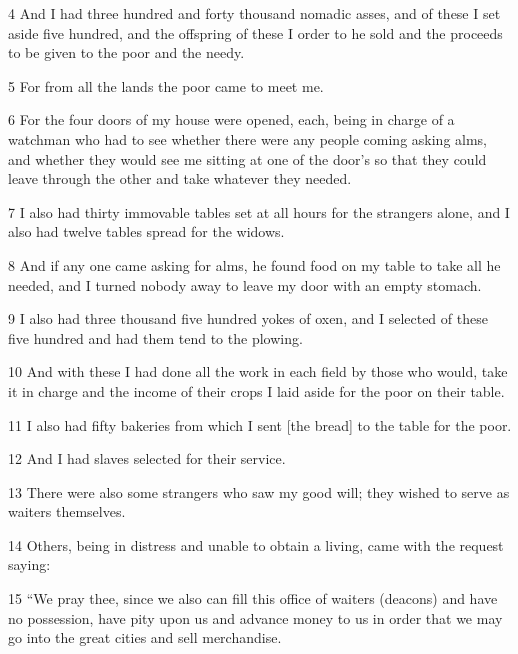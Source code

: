 \par 4 And I had three hundred and forty thousand nomadic asses, and of these I set aside five hundred, and the offspring of these I order to he sold and the proceeds to be given to the poor and the needy.

\par 5 For from all the lands the poor came to meet me.

\par 6 For the four doors of my house were opened, each, being in charge of a watchman who had to see whether there were any people coming asking alms, and whether they would see me sitting at one of the door’s so that they could leave through the other and take whatever they needed.

\par 7 I also had thirty immovable tables set at all hours for the strangers alone, and I also had twelve tables spread for the widows.

\par 8 And if any one came asking for alms, he found food on my table to take all he needed, and I turned nobody away to leave my door with an empty stomach.

\par 9 I also had three thousand five hundred yokes of oxen, and I selected of these five hundred and had them tend to the plowing.

\par 10 And with these I had done all the work in each field by those who would, take it in charge and the income of their crops I laid aside for the poor on their table.

\par 11 I also had fifty bakeries from which I sent [the bread] to the table for the poor.

\par 12 And I had slaves selected for their service.

\par 13 There were also some strangers who saw my good will; they wished to serve as waiters themselves.

\par 14 Others, being in distress and unable to obtain a living, came with the request saying:

\par 15 “We pray thee, since we also can fill this office of waiters (deacons) and have no possession, have pity upon us and advance money to us in order that we may go into the great cities and sell merchandise.


